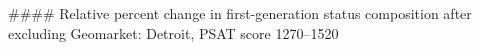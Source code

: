 #### Relative percent change in first-generation status composition after excluding Geomarket: Detroit, PSAT score 1270–1520
